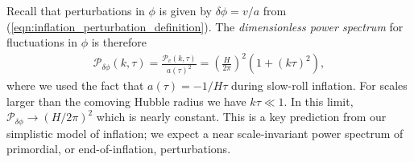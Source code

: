 Recall that perturbations in $\phi$ is given by $\delta\phi = v/a$ from (\ref{eqn:inflation_perturbation_definition}). The \textit{dimensionless power spectrum} for fluctuations in $\phi$ is therefore
\begin{align}
	\mathcal{P}_{\delta\phi} (k,\tau) = \frac{\mathcal{P}_v (k,\tau)}{a(\tau)^2} = \left( \frac{H}{2\pi} \right)^2 \left(1 + (k\tau)^2 \right),
\end{align}
where we used the fact that $a(\tau) = -1/H\tau$ during slow-roll inflation. For scales larger than the comoving Hubble radius we have $k\tau \ll 1$. In this limit, $\mathcal{P}_{\delta\phi} \rightarrow (H/2\pi)^2$ which is nearly constant. This is a key prediction from our simplistic model of inflation; we expect a near scale-invariant power spectrum of primordial, or end-of-inflation, perturbations.